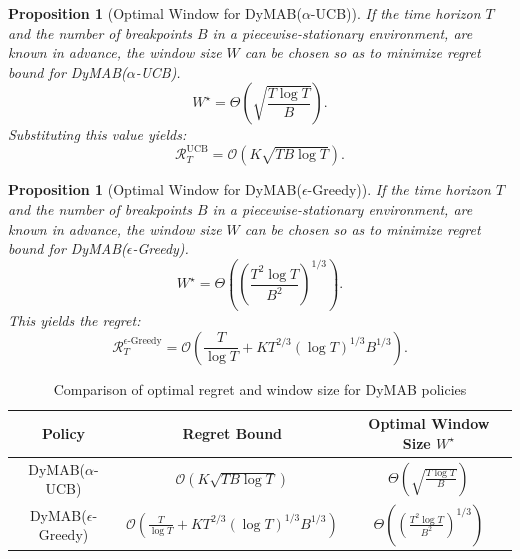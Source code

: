 \documentclass[review]{jair}
\newtheorem{proposition}[theorem]{Proposition}
\begin{document}
\begin{proposition}[Optimal Window for DyMAB($\alpha$-UCB)]
If the time horizon $T$ and the number of breakpoints $B$ in a piecewise-stationary environment, are known in advance, the window size $W$ can be chosen so as to minimize regret bound for DyMAB($\alpha$-UCB). 
\begin{equation}
W^\star = \Theta\left( \sqrt{ \frac{T \log T}{B} } \right).
\end{equation}
Substituting this value yields:
\begin{equation}
\mathcal{R}_T^{\mathrm{UCB}} = \mathcal{O}\left( K \sqrt{T B \log T} \right).
\end{equation}
\end{proposition}

\vspace{1em}

\begin{proposition}[Optimal Window for DyMAB($\epsilon$-Greedy)]
If the time horizon $T$ and the number of breakpoints $B$ in a piecewise-stationary environment, are known in advance, the window size $W$ can be chosen so as to minimize regret bound for DyMAB($\epsilon$-Greedy).
\begin{equation}
W^\star = \Theta\left( \left( \frac{T^2 \log T}{B^2} \right)^{1/3} \right).
\end{equation}
This yields the regret:
\begin{equation}
\mathcal{R}_T^{\epsilon\text{-Greedy}} = \mathcal{O}\left( \frac{T}{\log T} + K T^{2/3} (\log T)^{1/3} B^{1/3} \right).
\end{equation}
\end{proposition}


\begin{table}[t]
\centering
\caption{Comparison of optimal regret and window size for DyMAB policies}
\begin{tabular}{|c|c|c|}
\hline
\textbf{Policy} & \textbf{Regret Bound} & \textbf{Optimal Window Size $W^\star$} \\
\hline
DyMAB($\alpha$-UCB) & $\mathcal{O}\left( K \sqrt{T B \log T} \right)$ & $\Theta\left( \sqrt{ \frac{T \log T}{B} } \right)$ \\
\hline
DyMAB($\epsilon$-Greedy) & $\mathcal{O}\left( \frac{T}{\log T} + K T^{2/3} (\log T)^{1/3} B^{1/3} \right)$ & $\Theta\left( \left( \frac{T^2 \log T}{B^2} \right)^{1/3} \right)$ \\
\hline
\end{tabular}
\label{tab:comp}
\end{table}
\end{document}
